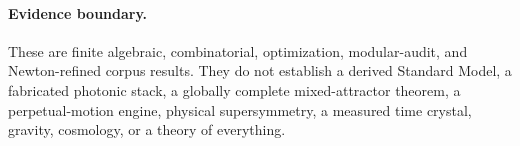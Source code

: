 \paragraph{Evidence boundary.}
These are finite algebraic, combinatorial, optimization, modular-audit, and Newton-refined corpus results.  They do not establish a derived Standard Model, a fabricated photonic stack, a globally complete mixed-attractor theorem, a perpetual-motion engine, physical supersymmetry, a measured time crystal, gravity, cosmology, or a theory of everything.

